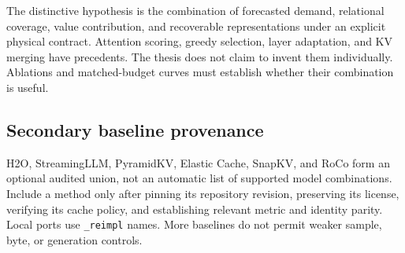 The distinctive hypothesis is the combination of forecasted demand, relational
coverage, value contribution, and recoverable representations under an explicit
physical contract. Attention scoring, greedy selection, layer adaptation, and
KV merging have precedents. The thesis does not claim to invent them individually.
Ablations and matched-budget curves must establish whether their combination
is useful.

\subsection{Secondary baseline provenance}
H2O, StreamingLLM, PyramidKV, Elastic Cache, SnapKV, and RoCo form an optional
audited union, not an automatic list of supported model combinations. Include
a method only after pinning its repository revision, preserving its license,
verifying its cache policy, and establishing relevant metric and identity
parity. Local ports use \texttt{\_reimpl} names. More baselines do not permit
weaker sample, byte, or generation controls.
